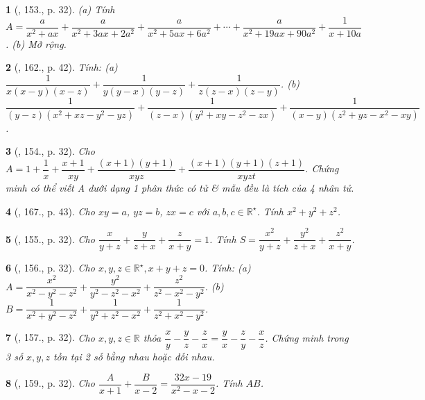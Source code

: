 \documentclass{article}
\newtheorem{baitoan}{}
\begin{document}
\begin{baitoan}[\cite{Tuyen_Toan_8}, 153., p. 32]
	(a) Tính $A = \dfrac{a}{x^2 + ax} + \dfrac{a}{x^2 + 3ax + 2a^2} + \dfrac{a}{x^2 + 5ax + 6a^2} + \cdots + \dfrac{a}{x^2 + 19ax + 90a^2} + \dfrac{1}{x + 10a}$. (b) Mở rộng.
\end{baitoan}

\begin{baitoan}[\cite{Tuyen_Toan_8_old}, 162., p. 42]
	Tính: (a) $\dfrac{1}{x(x - y)(x - z)} + \dfrac{1}{y(y - x)(y - z)} + \dfrac{1}{z(z - x)(z - y)}$. (b) $\dfrac{1}{(y - z)(x^2 + xz - y^2 - yz)} + \dfrac{1}{(z - x)(y^2 + xy - z^2 - zx)} + \dfrac{1}{(x - y)(z^2 + yz - x^2 - xy)}$.
\end{baitoan}

\begin{baitoan}[\cite{Tuyen_Toan_8}, 154., p. 32]
	Cho $A = 1 + \dfrac{1}{x} + \dfrac{x + 1}{xy} + \dfrac{(x + 1)(y + 1)}{xyz} + \dfrac{(x + 1)(y + 1)(z + 1)}{xyzt}$. Chứng minh có thể viết A dưới dạng 1 phân thức có tử \& mẫu đều là tích của 4 nhân tử.
\end{baitoan}

\begin{baitoan}[\cite{Tuyen_Toan_8_old}, 167., p. 43]
	Cho $xy = a$, $yz = b$, $zx = c$ với $a,b,c\in\mathbb{R}^\star$. Tính $x^2 + y^2 + z^2$.
\end{baitoan}

\begin{baitoan}[\cite{Tuyen_Toan_8}, 155., p. 32]
	Cho $\dfrac{x}{y + z} + \dfrac{y}{z + x} + \dfrac{z}{x + y} = 1$. Tính $S = \dfrac{x^2}{y + z} + \dfrac{y^2}{z + x} + \dfrac{z^2}{x + y}$.
\end{baitoan}

\begin{baitoan}[\cite{Tuyen_Toan_8}, 156., p. 32]
	Cho $x,y,z\in\mathbb{R}^\star,x + y + z = 0$. Tính: (a) $A = \dfrac{x^2}{x^2 - y^2 - z^2} + \dfrac{y^2}{y^2 - z^2 - x^2} + \dfrac{z^2}{z^2 - x^2 - y^2}$. (b) $B = \dfrac{1}{x^2 + y^2 - z^2} + \dfrac{1}{y^2 + z^2 - x^2} + \dfrac{1}{z^2 + x^2 - y^2}$.
\end{baitoan}

\begin{baitoan}[\cite{Tuyen_Toan_8}, 157., p. 32]
	Cho $x,y,z\in\mathbb{R}$ thỏa $\dfrac{x}{y} - \dfrac{y}{z} - \dfrac{z}{x} = \dfrac{y}{x} - \dfrac{z}{y} - \dfrac{x}{z}$. Chứng minh trong 3 số $x,y,z$ tồn tại 2 số bằng nhau hoặc đối nhau.
\end{baitoan}

\begin{baitoan}[\cite{Tuyen_Toan_8}, 159., p. 32]
	Cho $\dfrac{A}{x + 1} + \dfrac{B}{x - 2} = \dfrac{32x - 19}{x^2 - x - 2}$. Tính $AB$.
\end{baitoan}
\end{document}

